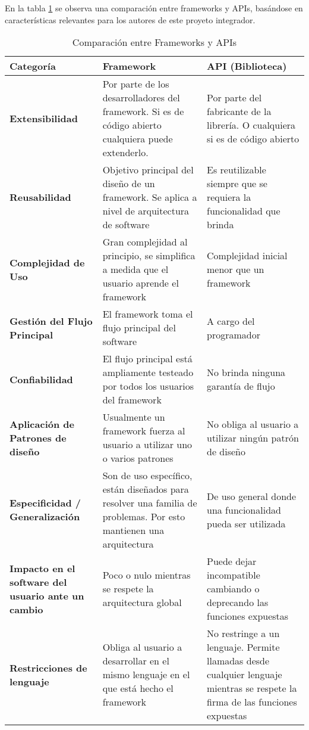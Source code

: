 En la tabla \ref {tab:comparacion_frameworks_apis} se observa una comparación
entre frameworks y APIs, basándose en características relevantes para los
autores de este proyeto integrador.
\begin{table}
	\centering
	\begin{tabularx}{\textwidth}{ | p{2.5cm} | X | X | }
	\hline
	\textbf{Categoría} & \textbf{Framework} & \textbf{API (Biblioteca)} \\[10pt]
	\hline \textbf{Extensibilidad} & Por parte de los desarrolladores del
	framework.
	Si es de código abierto cualquiera puede extenderlo. & Por parte del fabricante de la
	librería.
	O cualquiera si es de código abierto \\[10pt] \hline
	\textbf{Reusabilidad} & Objetivo principal del diseño de un framework.
	Se aplica a nivel de arquitectura de software & Es reutilizable siempre que se
	requiera la funcionalidad que brinda\\[10pt] \hline
	\textbf{Complejidad de Uso} & Gran complejidad al principio, se simplifica
	a medida que el usuario aprende el framework & Complejidad inicial menor que un
	framework\\[10pt] \hline 
	\textbf{Gestión del Flujo Principal} & El framework toma el
	flujo principal del software & A cargo del programador\\[10pt] \hline
	\textbf{Confiabilidad} & El flujo principal está ampliamente testeado por todos
	los usuarios del framework & No brinda ninguna garantía de flujo\\[10pt] \hline
	\textbf{Aplicación de Patrones de diseño} & Usualmente un framework fuerza al
	usuario a utilizar uno o varios patrones & No obliga al usuario a utilizar ningún patrón
	de diseño\\[10pt] \hline 
	\textbf{Especificidad / Generalización} & Son de uso específico,
	están diseñados para resolver una familia de problemas. Por esto mantienen una
	arquitectura & De uso general donde una funcionalidad pueda ser
	utilizada\\[10pt] \hline 
	\textbf{Impacto en el software del usuario ante un cambio} &
	Poco o nulo mientras se respete la arquitectura global & Puede dejar
	incompatible cambiando o deprecando las funciones expuestas\\[10pt] \hline
	\textbf{Restricciones de lenguaje} & Obliga al usuario a
	desarrollar en el mismo lenguaje en el que está hecho el framework & No restringe a un lenguaje.
	Permite llamadas desde cualquier lenguaje mientras se respete la firma de las funciones expuestas\\[10pt] 
	\hline
	\end{tabularx}
	\caption{Comparación entre Frameworks y APIs}
	\label{tab:comparacion_frameworks_apis}
\end{table}

